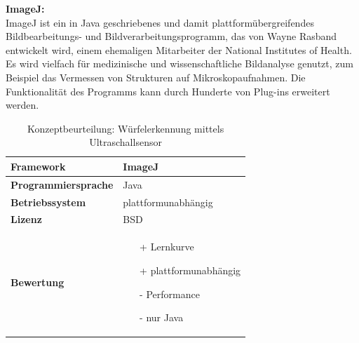 \documentclass[../../../main.tex]{subfiles}
\begin{document}
        \textbf{ImageJ: }\\
        ImageJ ist ein in Java geschriebenes und damit plattformübergreifendes Bildbearbeitungs- und Bildverarbeitungsprogramm, das von Wayne Rasband entwickelt wird, einem ehemaligen Mitarbeiter der National Institutes of Health. Es wird vielfach für medizinische und wissenschaftliche Bildanalyse genutzt, zum Beispiel das Vermessen von Strukturen auf Mikroskopaufnahmen. Die Funktionalität des Programms kann durch Hunderte von Plug-ins erweitert werden.
        \begin{flushleft}
            \begin{table}[h]
            \begin{tabular}{ | l | p{11cm} |}
            \hline
            \textbf{Framework} & ImageJ \\ \hline
            \textbf{Programmiersprache} & Java \\ \hline
            \textbf{Betriebssystem} & plattformunabhängig \\ \hline
            \textbf{Lizenz} & BSD \\ \hline
            \textbf{Bewertung} &  \begin{itemize}
                                    \item[+] Lernkurve
                                    \item[+] plattformunabhängig 
                                    \item[-] Performance
                                    \item[-] nur Java 
                                  \end{itemize} \\ \hline
            \end{tabular}
            \caption{Konzeptbeurteilung: Würfelerkennung mittels Ultraschallsensor}
            \label{tab:konzept_wurfel_ultraschall}
            \end{table}
        \end{flushleft}
        \pagebreak
\end{document}
